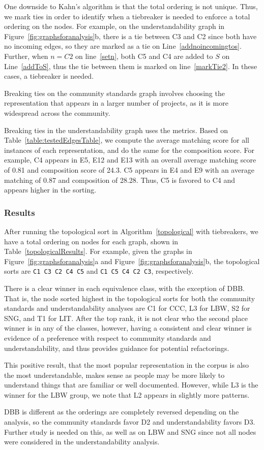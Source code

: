One downside to Kahn's algorithm is that the total ordering is not unique. Thus, we mark ties in order to identify when a tiebreaker is needed to enforce a total ordering on the nodes. For example, on the understandability graph in Figure~\ref{fig:graphsforanalysis}b, there is a tie between C3 and C2 since both have no incoming edges, so they are marked as a tie on Line~\ref{addnoincomingtos}. Further, when $n=C2$ on line~\ref{setn}, both C5 and C4 are added to $S$ on Line~\ref{addToS}, thus the tie between them is marked on line~\ref{markTie2}. In these cases, a tiebreaker is needed.

Breaking ties on the community standards graph involves choosing the representation that appears in a larger number of projects, as it is more widespread across the community.

Breaking ties in the understandability graph uses the metrics. Based on Table~\ref{table:testedEdgesTable}, we compute the average matching score for all instances of each representation, and do the same for the composition score. For example, C4 appears in E5, E12 and E13 with an overall average matching score of 0.81 and composition score of 24.3. C5 appears in E4 and E9 with an average matching of 0.87 and composition of 28.28. Thus, C5 is favored to C4 and appears higher in the sorting.

\subsubsection{Results}
After running the topological sort in Algorithm~\ref{topological} with tiebreakers, we have a total ordering on nodes for each graph, shown in Table~\ref{topologicalResults}.  For example, given the graphs in Figure~\ref{fig:graphsforanalysis}a and Figure~\ref{fig:graphsforanalysis}b, the topological sorts are {\tt C1 C3 C2 C4 C5} and {\tt C1 C5 C4 C2 C3}, respectively.



There is a clear winner in each equivalence class, with the exception of DBB.
That is, the node sorted highest in the topological sorts for both the community standards and understandability analyses are C1 for CCC, L3 for LBW, S2 for SNG, and T1 for LIT.
After the top rank, it is not clear who the second place winner is in any of the classes, however, having a consistent and clear winner is evidence of a preference with respect to community standards and understandability, and thus provides guidance for potential refactorings.

This positive result, that the most popular representation in the corpus is also the most understandable, makes sense as people may be more likely to understand things that are familiar or well documented. However, while L3 is the winner for the LBW group, we note that L2 appears in slightly more patterns.

DBB is different  as the orderings are completely reversed depending on the analysis, so the community standards favor D2 and understandability favors D3. Further study is needed on this, as well as on LBW and SNG since not all nodes were considered in the understandability analysis.
